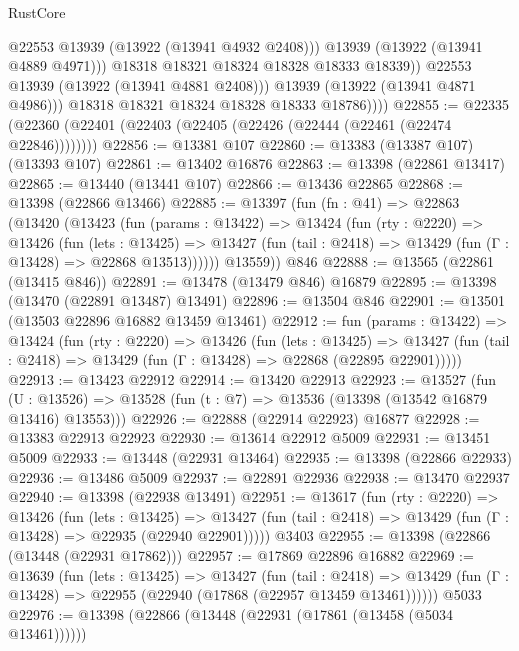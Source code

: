 \begin{lexlean}{RustCore}
\begin{coremodule}
                        @22553
                        @13939
                        (@13922 (@13941 @4932 @2408)))
                      @13939
                      (@13922 (@13941 @4889 @4971)))
                    @18318
                    @18321
                    @18324
                    @18328
                    @18333
                    @18339))
                @22553
                @13939
                (@13922 (@13941 @4881 @2408)))
              @13939
              (@13922 (@13941 @4871 @4986)))
            @18318
            @18321
            @18324
            @18328
            @18333
            @18786))))
@22855 := @22335 (@22360 (@22401 (@22403 (@22405 (@22426 (@22444 (@22461 (@22474 @22846))))))))
@22856 := @13381 @107
@22860 := @13383 (@13387 @107) (@13393 @107)
@22861 := @13402 @16876
@22863 := @13398 (@22861 @13417)
@22865 := @13440 (@13441 @107)
@22866 := @13436 @22865
@22868 := @13398 (@22866 @13466)
@22885 := @13397
    (fun (fn : @41) =>
    @22863
      (@13420
        (@13423
          (fun (params : @13422) =>
          @13424
            (fun (rty : @2220) =>
            @13426
              (fun (lets : @13425) =>
              @13427 (fun (tail : @2418) => @13429 (fun (Γ : @13428) => @22868 @13513))))))
        @13559))
    @846
@22888 := @13565 (@22861 (@13415 @846))
@22891 := @13478 (@13479 @846) @16879
@22895 := @13398 (@13470 (@22891 @13487) @13491)
@22896 := @13504 @846
@22901 := @13501 (@13503 @22896 @16882 @13459 @13461)
@22912 := fun (params : @13422) =>
  @13424
    (fun (rty : @2220) =>
    @13426
      (fun (lets : @13425) =>
      @13427 (fun (tail : @2418) => @13429 (fun (Γ : @13428) => @22868 (@22895 @22901)))))
@22913 := @13423 @22912
@22914 := @13420 @22913
@22923 := @13527
    (fun (U : @13526) => @13528 (fun (t : @7) => @13536 (@13398 (@13542 @16879 @13416) @13553)))
@22926 := @22888 (@22914 @22923) @16877
@22928 := @13383 @22913 @22923
@22930 := @13614 @22912 @5009
@22931 := @13451 @5009
@22933 := @13448 (@22931 @13464)
@22935 := @13398 (@22866 @22933)
@22936 := @13486 @5009
@22937 := @22891 @22936
@22938 := @13470 @22937
@22940 := @13398 (@22938 @13491)
@22951 := @13617
    (fun (rty : @2220) =>
    @13426
      (fun (lets : @13425) =>
      @13427 (fun (tail : @2418) => @13429 (fun (Γ : @13428) => @22935 (@22940 @22901)))))
    @3403
@22955 := @13398 (@22866 (@13448 (@22931 @17862)))
@22957 := @17869 @22896 @16882
@22969 := @13639
    (fun (lets : @13425) =>
    @13427
      (fun (tail : @2418) =>
      @13429 (fun (Γ : @13428) => @22955 (@22940 (@17868 (@22957 @13459 @13461))))))
    @5033
@22976 := @13398 (@22866 (@13448 (@22931 (@17861 (@13458 (@5034 @13461))))))

\end{coremodule}
\end{lexlean}
